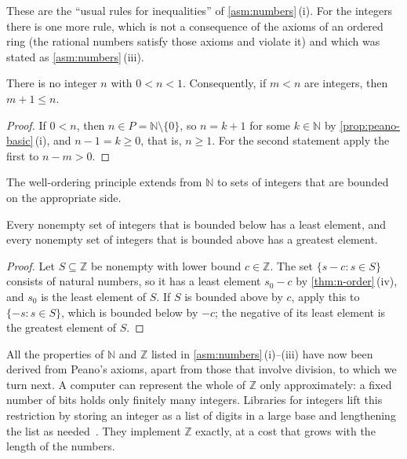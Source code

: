 These are the ``usual rules for inequalities'' of \cref{asm:numbers}\,(i). For the integers there is one more rule, which is not a consequence of the axioms of an ordered ring (the rational numbers satisfy those axioms and violate it) and which was stated as \cref{asm:numbers}\,(iii).

\begin{proposition}
\label{prop:z-discrete}
There is no integer $n$ with $0<n<1$. Consequently, if $m<n$ are integers, then $m+1\le n$.
\end{proposition}

\begin{proof}
If $0<n$, then $n\in P=\mathbb N\setminus\{0\}$, so $n=k+1$ for some $k\in\mathbb N$ by \cref{prop:peano-basic}\,(i), and $n-1=k\ge0$, that is, $n\ge1$. For the second statement apply the first to $n-m>0$.
\end{proof}

The well-ordering principle extends from $\mathbb N$ to sets of integers that are bounded on the appropriate side.

\begin{corollary}
\label{cor:z-well-order}
Every nonempty set of integers that is bounded below has a least element, and every nonempty set of integers that is bounded above has a greatest element.
\end{corollary}

\begin{proof}
Let $S\subseteq\mathbb Z$ be nonempty with lower bound $c\in\mathbb Z$. The set $\{s-c: s\in S\}$ consists of natural numbers, so it has a least element $s_0-c$ by \cref{thm:n-order}\,(iv), and $s_0$ is the least element of $S$. If $S$ is bounded above by $c$, apply this to $\{-s: s\in S\}$, which is bounded below by $-c$; the negative of its least element is the greatest element of $S$.
\end{proof}

All the properties of $\mathbb N$ and $\mathbb Z$ listed in \cref{asm:numbers}\,(i)--(iii) have now been derived from Peano's axioms, apart from those that involve division, to which we turn next. A computer can represent the whole of $\mathbb Z$ only approximately: a fixed number of bits holds only finitely many integers. Libraries for  integers lift this restriction by storing an integer as a list of digits in a large base and lengthening the list as needed~\cite[Sect.~4.3]{knuth1997taocp2}. They implement $\mathbb Z$ exactly, at a cost that grows with the length of the numbers.

